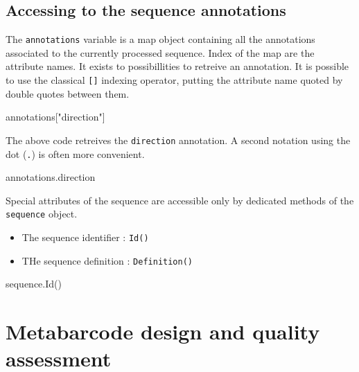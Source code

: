 \documentclass[
  letterpaper,
  DIV=11,
  numbers=noendperiod]{scrreprt}
\newenvironment{Shaded}{\begin{snugshade}}{\end{snugshade}}
\newcommand{\NormalTok}[1]{\textcolor[rgb]{0.00,0.23,0.31}{#1}}
\newcommand{\OperatorTok}[1]{\textcolor[rgb]{0.37,0.37,0.37}{#1}}
\newcommand{\StringTok}[1]{\textcolor[rgb]{0.13,0.47,0.30}{#1}}
\providecommand{\tightlist}{%
  \setlength{\itemsep}{0pt}\setlength{\parskip}{0pt}}\usepackage{longtable,booktabs,array}
\begin{document}
\hypertarget{accessing-to-the-sequence-annotations}{%
\section{Accessing to the sequence
annotations}\label{accessing-to-the-sequence-annotations}}

The \texttt{annotations} variable is a map object containing all the
annotations associated to the currently processed sequence. Index of the
map are the attribute names. It exists to possibillities to retreive an
annotation. It is possible to use the classical \texttt{{[}{]}} indexing
operator, putting the attribute name quoted by double quotes between
them.

\begin{Shaded}
\begin{Highlighting}[]
\NormalTok{annotations}\OperatorTok{[}\StringTok{"direction"}\OperatorTok{]}
\end{Highlighting}
\end{Shaded}

The above code retreives the \texttt{direction} annotation. A second
notation using the dot (\texttt{.}) is often more convenient.

\begin{Shaded}
\begin{Highlighting}[]
\NormalTok{annotations}\OperatorTok{.}\NormalTok{direction}
\end{Highlighting}
\end{Shaded}

Special attributes of the sequence are accessible only by dedicated
methods of the \texttt{sequence} object.

\begin{itemize}
\tightlist
\item
  The sequence identifier : \texttt{Id()}
\item
  THe sequence definition : \texttt{Definition()}
\end{itemize}

\begin{Shaded}
\begin{Highlighting}[]
\NormalTok{sequence}\OperatorTok{.}\NormalTok{Id}\OperatorTok{()}
\end{Highlighting}
\end{Shaded}

\hypertarget{metabarcode-design-and-quality-assessment}{%
\chapter{Metabarcode design and quality
assessment}\label{metabarcode-design-and-quality-assessment}}
\end{document}
